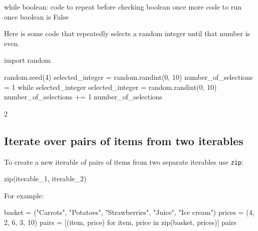 \begin{pyin}
while boolean:
    code to repeat before checking boolean once more
code to run once boolean is False
\end{pyin}

Here is some code that repeatedly selects a random integer until that number is
even.


\begin{pyin}
import random

random.seed(4)
selected_integer = random.randint(0, 10)
number_of_selections = 1
while selected_integer %
    selected_integer = random.randint(0, 10)
    number_of_selections += 1
number_of_selections
\end{pyin}





\begin{pyin}
2
\end{pyin}





\subsection{Iterate over pairs of items from two iterables}
\label{\detokenize{building-tools/01-variables-conditionals-loops/how/main:iterate-over-pairs-of-items-from-two-iterables}}

To create a new iterable of pairs of items from two separate iterables use
\texttt{zip}:


\begin{pyin}
zip(iterable_1, iterable_2)
\end{pyin}



For example:




\begin{pyin}
basket = ("Carrots", "Potatoes", "Strawberries", "Juice", "Ice cream")
prices = (4, 2, 6, 3, 10)
pairs = [(item, price) for item, price in zip(basket, prices)]
pairs
\end{pyin}





\begin{raw}
\end{raw}





